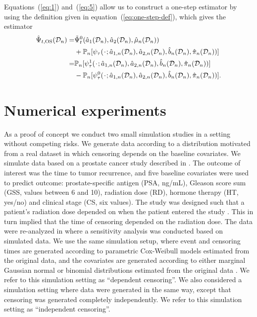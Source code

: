 \documentclass{statsoc}
\newcommand{\blank}{\makebox[1ex]{\textbf{$\cdot$}}}
\newcommand{\1}{\mathds{1}}
\newcommand{\empmeas}{\ensuremath{\mathbb{P}_n}} %
\newcommand{\data}{\ensuremath{\mathcal{D}}}
\begin{document}
Equations~(\ref{eq:1}) and~(\ref{eq:5}) allow us to construct a one-step
estimator by using the definition given in equation~(\ref{eq:one-step-def}),
which gives the estimator
\begin{equation}
  \label{eq:one-step-comp-ate}
  \begin{split}
    \hat{\Psi}_{t,\text{OS}}(\data_n)
    = &
        \tilde{\Psi}_{t}^0(\hat{a}_1(\data_n), \hat{a}_2(\data_n),
        \hat{\mu}_n(\data_n))
    \\
      &
        +
        \empmeas{[\psi_{\tau}(\blank; \hat{a}_{1,n}(\data_n), \hat{a}_{2,n}(\data_n),
        \hat{b}_n(\data_n), \hat{\pi}_n(\data_n))]}
    \\
    = &
        \empmeas{[\psi_{\tau}^1(\blank; \hat{a}_{1,n}(\data_n), \hat{a}_{2,n}(\data_n),
        \hat{b}_n(\data_n), \hat{\pi}_n(\data_n))]}
    \\
      &
        - \empmeas{[\psi_{\tau}^0(\blank; \hat{a}_{1,n}(\data_n), \hat{a}_{2,n}(\data_n),
        \hat{b}_n(\data_n), \hat{\pi}_n(\data_n))]}.
  \end{split}
\end{equation}


\section{Numerical experiments}
\label{sec:numer-exper}

As a proof of concept we conduct two small simulation studies in a setting
without competing risks. We generate data according to a distribution motivated
from a real dataset in which censoring depends on the baseline covariates. We
simulate data based on a prostate cancer study described in
\citep{kattan2000pretreatment}. The outcome of interest was the time to tumor
recurrence, and five baseline covariates were used to predict outcome:
prostate-specific antigen (PSA, ng/mL), Gleason score sum (GSS, values between 6
and 10), radiation dose (RD), hormone therapy (HT, yes/no) and clinical stage
(CS, six values). The study was designed such that a patient's radiation dose
depended on when the patient entered the study \citep{gerds2013estimating}. This
in turn implied that the time of censoring depended on the radiation dose. The
data were re-analyzed in \citep{gerds2013estimating} where a sensitivity
analysis was conducted based on simulated data. We use the same simulation
setup, where event and censoring times are generated according to parametric
Cox-Weibull models estimated from the original data, and the covariates are
generated according to either marginal Gaussian normal or binomial distributions
estimated from the original data
\citep[c.f.,][Section~4.6]{gerds2013estimating}. We refer to this simulation
setting as ``dependent censoring''. We also considered a simulation setting
where data were generated in the same way, except that censoring was generated
completely independently. We refer to this simulation setting as ``independent
censoring''.
\end{document}
